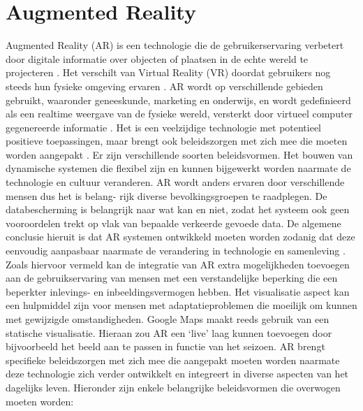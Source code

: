 \section{Augmented Reality}
\label{sec:augmented-reality}

Augmented Reality (AR) is een technologie die de gebruikerservaring verbetert door digitale informatie over objecten of plaatsen in de echte wereld te projecteren \autocite{Berryman2012}. Het verschilt van Virtual Reality (VR) doordat gebruikers nog steeds hun fysieke omgeving ervaren \autocite{Calo2015}. AR wordt op verschillende gebieden gebruikt, waaronder geneeskunde, marketing en onderwijs, en wordt gedefinieerd als een realtime weergave van de fysieke wereld, versterkt door virtueel computer gegenereerde informatie \autocite{Carmigniani2011}. Het is een veelzijdige technologie met potentieel positieve toepassingen, maar brengt ook beleidszorgen met zich mee die moeten worden aangepakt \autocite{Calo2015}. Er zijn verschillende soorten beleidsvormen. Het bouwen van dynamische systemen die flexibel zijn en kunnen bijgewerkt worden naarmate de technologie en cultuur veranderen. AR wordt anders ervaren door verschillende mensen dus het is belang- rijk diverse bevolkingsgroepen te raadplegen. De databescherming is belangrijk naar wat kan en niet, zodat het systeem ook geen vooroordelen trekt op vlak van bepaalde verkeerde gevoede data. De algemene conclusie hieruit is dat AR systemen ontwikkeld moeten worden zodanig dat deze eenvoudig aanpasbaar naarmate de verandering in technologie en samenleving \autocite{Calo2015}. Zoals hiervoor vermeld kan de integratie van AR extra mogelijkheden toevoegen aan de gebruikservaring van mensen met een verstandelijke beperking die een beperkter inlevings- en inbeeldingsvermogen hebben. Het visualisatie aspect kan een hulpmiddel zijn voor mensen met adaptatieproblemen die moeilijk om kunnen met gewijzigde omstandigheden. Google Maps maakt reeds gebruik van een statische visualisatie. Hieraan zou AR een `live' laag kunnen toevoegen door bijvoorbeeld het beeld aan te passen in functie van het seizoen. AR brengt specifieke beleidszorgen met zich mee die aangepakt moeten worden naarmate deze technologie zich verder ontwikkelt en integreert in diverse aspecten van het dagelijks leven. Hieronder zijn enkele belangrijke beleidsvormen die overwogen moeten worden:

